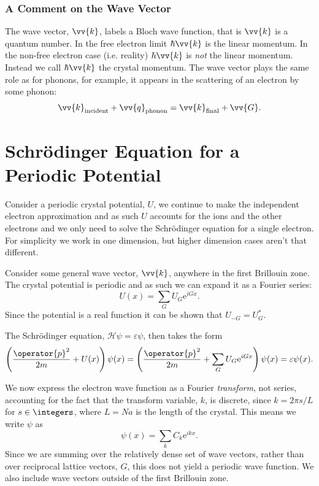 \documentclass[fleqn]{NotesClass}
\newcommand*{\e}{\mathrm{e}}
\newcommand*{\hamiltonian}{\mathcal{H}}
\begin{document}
    \subsubsection{A Comment on the Wave Vector}
    The wave vector, \(\vv{k}\), labels a Bloch wave function, that is \(\vv{k}\) is a quantum number.
    In the free electron limit \(\hbar\vv{k}\) is the linear momentum.
    In the non-free electron case (i.e. reality) \(\hbar\vv{k}\) is \emph{not} the linear momentum.
    Instead we call \(\hbar\vv{k}\) the crystal momentum.
    The wave vector plays the same role as for phonons, for example, it appears in the scattering of an electron by some phonon:
    \begin{equation}
        \vv{k}_{\mathrm{incident}} + \vv{q}_{\mathrm{phonon}} = \vv{k}_{\mathrm{final}} + \vv{G}.
    \end{equation}
    
    \section{Schr\"odinger Equation for a Periodic Potential}
    Consider a periodic crystal potential, \(U\), we continue to make the independent electron approximation and as such \(U\) accounts for the ions and the other electrons and we only need to solve the Schr\"odinger equation for a single electron.
    For simplicity we work in one dimension, but higher dimension cases aren't that different.
    
    Consider some general wave vector, \(\vv{k}\), anywhere in the first Brillouin zone.
    The crystal potential is periodic and as such we can expand it as a Fourier series:
    \begin{equation}
        U(x) = \sum_{G} U_G \e^{iGx}.
    \end{equation}
    Since the potential is a real function it can be shown that \(U_{-G} = U_G^*\).
    
    The Schr\"odinger equation, \(\hamiltonian\psi = \varepsilon\psi\), then takes the form
    \begin{equation}
        \left( \frac{\operator{p}^2}{2m} + U(x) \right)\psi(x) = \left( \frac{\operator{p}^2}{2m} + \sum_G U_G\e^{iGx} \right)\psi(x) = \varepsilon\psi(x).
    \end{equation}
    
    We now express the electron wave function as a Fourier \emph{transform}, not series, accounting for the fact that the transform variable, \(k\), is discrete, since \(k = 2\pi s/L\) for \(s \in \integers\), where \(L = Na\) is the length of the crystal.
    This means we write \(\psi\) as
    \begin{equation}
        \psi(x) = \sum_{k} C_k\e^{ikx}.
    \end{equation}
    Since we are summing over the relatively dense set of wave vectors, rather than over reciprocal lattice vectors, \(G\), this does not yield a periodic wave function.
    We also include wave vectors outside of the first Brillouin zone.
    
\end{document}
